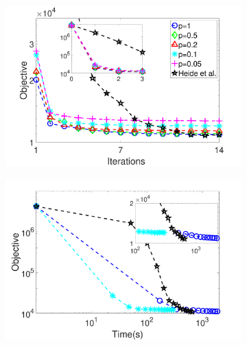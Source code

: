 \begin{figure}[h]
\begin{subfigure}{0.5\textwidth}
  \includegraphics[width=1\linewidth]{figure/iteVSobj-city.pdf}
\end{subfigure}
\begin{subfigure}{0.5\textwidth}
  \includegraphics[width=1\linewidth]{figure/timeVSobj-city.pdf}
\end{subfigure}


\end{figure}
